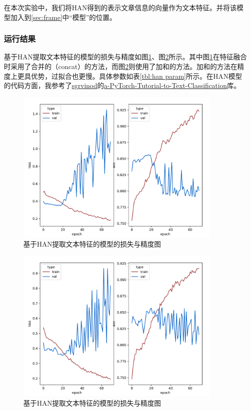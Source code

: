 \documentclass[lang=cn,a4paper]{elegantpaper}
\begin{document}
在本次实验中，我们将HAN得到的表示文章信息的向量作为文本特征。并将该模型加入到\ref{sec:frame}中“模型”的位置。



\subsubsection{运行结果}

基于HAN提取文本特征的模型的损失与精度如图\ref{fig:han loss1}、图\ref{fig:han loss2}所示。其中图\ref{fig:han loss1}在特征融合时采用了合并的（concat）的方法，而图\ref{fig:han loss2}则使用了加和的方法。加和的方法在精度上更具优势，过拟合也更慢。具体参数如表\ref{tbl:han param}所示。在HAN模型的代码方面，我参考了\href{https://github.com/sgrvinod}{sgrvinod}的\href{https://github.com/sgrvinod/a-PyTorch-Tutorial-to-Text-Classification}{a-PyTorch-Tutorial-to-Text-Classification}库。
\begin{figure}[!htbp]
  \centering
  \includegraphics[width=4in]{image/han train 1.pdf}
  \caption{基于HAN提取文本特征的模型的损失与精度图}
  \label{fig:han loss1}
\end{figure}
\begin{figure}[!htbp]
  \centering
  \includegraphics[width=4in]{image/han train 2.pdf}
  \caption{基于HAN提取文本特征的模型的损失与精度图}
  \label{fig:han loss2}
\end{figure}
\end{document}
